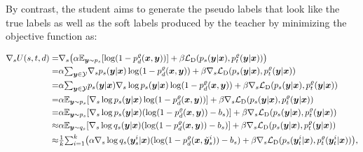 \documentclass{article}
\newcommand{\OVEC}[1]{\bm{#1}} %
\newcommand{\SVEC}[1]{\check{\bm{#1}}}
\newcommand{\COL}[1]{\mathcal{#1}} %
\newcommand{\UTIL}[1]{U(s,t,d)} %
\newcommand{\EXP}{\mathbb{E}} %
\newcommand{\DTN}{\mathcal{L}_{\rm{D}}}
\newcommand{\abbrpstd}{p_{s}}
\newcommand{\abbrqstd}{q_{s}}
\newcommand{\fullpstd}[1]{p_{s}(#1|\OVEC{x})}
\newcommand{\fullqstd}[1]{q_{s}(#1|\OVEC{x})}
\newcommand{\abbrptch}{p_{t}^{\varrho}}
\newcommand{\fullptch}[1]{p_{t}^{\varrho}(#1|\OVEC{x})}
\newcommand{\abbrpdis}{p_{d}^{\varrho}}
\newcommand{\fullpdis}[1]{p_{d}^{\varrho}(\OVEC{x},#1)}
\begin{document}
By contrast, the student aims to generate the pseudo labels that look like the true labels as well as the soft labels produced by the teacher by minimizing the objective function as:
\begin{small}
\begin{equation*}
\begin{aligned}
\nabla_{s}
\UTIL{}
=
&
\nabla_{s}
\big(
\alpha\EXP_{\OVEC{y}\sim\abbrpstd}[\log(1-\fullpdis{\OVEC{y}})]
+
\beta\DTN(\fullpstd{\OVEC{y}},\fullptch{\OVEC{y}})
\big)
\\
=
&
\alpha{\textstyle\sum}_{\OVEC{y}\in\COL{Y}}
\nabla_{s}\fullpstd{\OVEC{y}}\log(1-\fullpdis{\OVEC{y}})
+
\beta\nabla_{s}\DTN(\fullpstd{\OVEC{y}},\fullptch{\OVEC{y}})
\\
=
&
\alpha{\textstyle\sum}_{\OVEC{y}\in\COL{Y}}
\fullpstd{\OVEC{y}}\nabla_{s}\log\fullpstd{\OVEC{y}}\log(1-\fullpdis{\OVEC{y}})
+
\beta\nabla_{s}\DTN(\fullpstd{\OVEC{y}},\fullptch{\OVEC{y}})
\\
=
&
\alpha\EXP_{\OVEC{y}\sim\abbrpstd}
[\nabla_{s}\log\fullpstd{\OVEC{y}}\log(1-\fullpdis{\OVEC{y}})]
+
\beta\nabla_{s}\DTN(\fullpstd{\OVEC{y}},\fullptch{\OVEC{y}})
\\
=
&
\alpha\EXP_{\OVEC{y}\sim\abbrpstd}
[\nabla_{s}\log\fullpstd{\OVEC{y}}(\log(1-\fullpdis{\OVEC{y}})-b_{s})]
+
\beta\nabla_{s}\DTN(\fullpstd{\OVEC{y}},\fullptch{\OVEC{y}})
\\
\approx
&
\alpha\EXP_{\OVEC{y}\sim\abbrqstd}
[\nabla_{s}\log\fullqstd{\OVEC{y}}(\log(1-\fullpdis{\OVEC{y}})-b_{s})]
+
\beta\nabla_{s}\DTN(\fullpstd{\OVEC{y}},\fullptch{\OVEC{y}})
\\
\approx
&
{\textstyle\frac{1}{k}}
{\textstyle\sum}_{i=1}^{k}
\big(
\alpha
\nabla_{s}\log\fullqstd{\OVEC{y}^{i}_{s}}
(\log(1-\fullpdis{\SVEC{y}^{i}_{s}})-b_{s})
+
\beta
\nabla_{s}
\DTN(\fullpstd{\OVEC{y}^{i}_{t}},\fullptch{\OVEC{y}^{i}_{t}})
\big)
\text{,}
\\
\end{aligned}
\end{equation*}
\end{small}%
\end{document}
